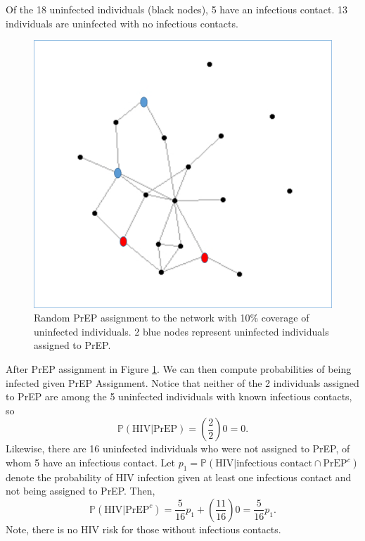 \documentclass{article}
\theoremstyle{definition}
\begin{document}
 Of the 18 uninfected individuals (black nodes), 5 have an infectious contact. 13 individuals are uninfected with no infectious contacts.
\begin{figure}[H]
    \centering
    \includegraphics[scale=0.5]{Figures/Network Example 2.png}
    \caption{Random PrEP assignment to the network with 10\% coverage of uninfected individuals. 2 blue nodes represent uninfected individuals assigned to PrEP.}
    \label{fig:Figure 3}
\end{figure}

After PrEP assignment in Figure \ref{fig:Figure 3}. We can then compute probabilities of being infected given PrEP Assignment. Notice that neither of the 2 individuals assigned to PrEP are among the 5 uninfected individuals with known infectious contacts, so $$\mathbb{P}\left(\text{HIV}\vert \text{PrEP}\right)=\left(\frac{2}{2}\right)0=0.$$
Likewise, there are 16 uninfected individuals who were not assigned to PrEP, of whom 5 have an infectious contact. Let $p_{1}=\mathbb{P}\left(\text{HIV} \vert \text{infectious contact} \cap \text{PrEP}^{c}\right)$ denote the probability of HIV infection given at least one infectious contact and not being assigned to PrEP.  Then, $$\mathbb{P}\left(\text{HIV} \vert \text{PrEP}^c\right)=\frac{5}{16}p_{1}+\left(\frac{11}{16}\right)0=\frac{5}{16}p_{1}.$$ Note, there is no HIV risk for those without infectious contacts.
\end{document}

